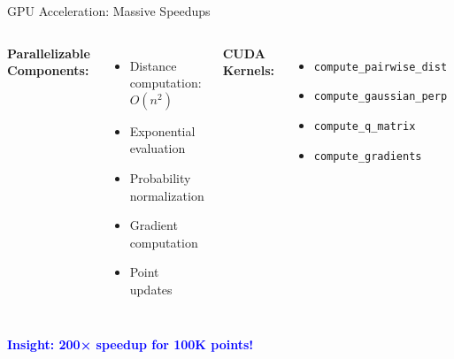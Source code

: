 \documentclass[aspectratio=169]{beamer}
\newcommand{\conceptbox}[2]{\colorbox{#1!20}{\textcolor{#1}{\textbf{#2}}}}
\newcommand{\insight}[1]{\conceptbox{blue}{Insight: #1}}
\begin{document}
\begin{frame}{GPU Acceleration: Massive Speedups}
\begin{columns}
\textbf{Parallelizable Components:}
\begin{itemize}
\item Distance computation: $O(n^2)$
\item Exponential evaluation
\item Probability normalization
\item Gradient computation
\item Point updates
\end{itemize}

\textbf{CUDA Kernels:}
\begin{itemize}
\item \texttt{compute\_pairwise\_dist}
\item \texttt{compute\_gaussian\_perp}
\item \texttt{compute\_q\_matrix}
\item \texttt{compute\_gradients}
\end{itemize}

\begin{center}
\end{center}
\end{columns}

\insight{200× speedup for 100K points!}
\end{frame}
\end{document}
